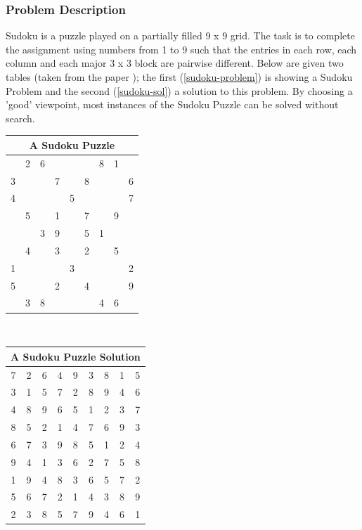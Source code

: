 \documentclass[a4paper]{scrartcl}
\begin{document}
\subsubsection{Problem Description}
Sudoku is a puzzle played on a partially filled 9 x 9 grid. The task 
is to complete the assignment using numbers from 1 to 9 such that the 
entries in each row, each column and each major 3 x 3 block are pairwise 
different. Below are given two tables (taken from the paper
\cite{8}); the first (\ref{sudoku-problem}) 
is showing a Sudoku Problem
and the second (\ref{sudoku-sol}) a solution to this problem.
By choosing  a 'good' viewpoint, most instances of the Sudoku Puzzle can be
solved without search.\\
\par
\par

\begin{tabular}{||c|c|c||c|c|c||c|c|c||}
\hline
\multicolumn{9}{||c||}{A Sudoku Puzzle \label{sudoku-problem}}\\
\hline
\hline
  & 2 & 6 &   &   &   & 8 & 1 &  \\
\hline
3 &   &   & 7 &   & 8 &   &   & 6\\
\hline
4 &   &   &   & 5 &   &   &   & 7\\
\hline
\hline
  & 5 &   & 1 &   & 7 &   & 9 &  \\
\hline
  &   & 3 & 9 &   & 5 & 1 &   &  \\
\hline
  & 4 &   & 3 &   & 2 &   & 5 &  \\
\hline
\hline
1 &   &   &   & 3 &   &   &   & 2\\
\hline
5 &   &   & 2 &   & 4 &   &   & 9\\
\hline
  & 3 & 8 &   &   &   & 4 & 6 &  \\
\hline   
\end{tabular}\\[1.0cm]

\begin{tabular}{||c|c|c||c|c|c||c|c|c||}
\hline
\multicolumn{9}{||c||}{A Sudoku Puzzle Solution \label{sudoku-sol}}\\
\hline
\hline
7 & 2 & 6 & 4 & 9 & 3 & 8 & 1 & 5\\
\hline
3 & 1 & 5 & 7 & 2 & 8 & 9 & 4 & 6\\
\hline
4 & 8 & 9 & 6 & 5 & 1 & 2 & 3 & 7\\
\hline
\hline
8 & 5 & 2 & 1 & 4 & 7 & 6 & 9 & 3\\
\hline
6 & 7 & 3 & 9 & 8 & 5 & 1 & 2 & 4\\
\hline
9 & 4 & 1 & 3 & 6 & 2 & 7 & 5 & 8\\
\hline
\hline
1 & 9 & 4 & 8 & 3 & 6 & 5 & 7 & 2\\
\hline
5 & 6 & 7 & 2 & 1 & 4 & 3 & 8 & 9\\
\hline
2 & 3 & 8 & 5 & 7 & 9 & 4 & 6 & 1\\
\hline   
\end{tabular}
\end{document}

